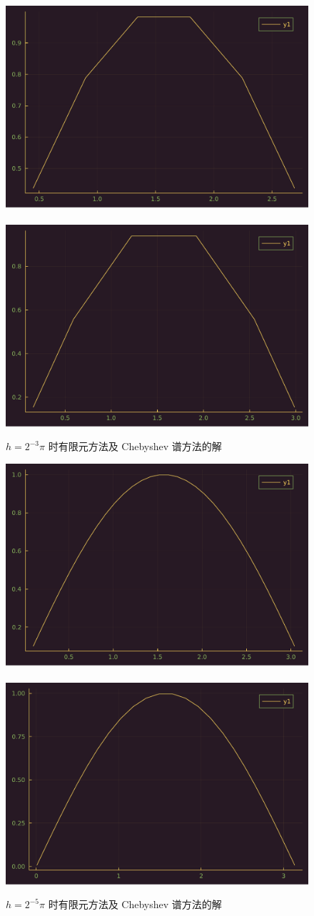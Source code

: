 \documentclass[UTF8, a4paper, 12pt, oneside, onecolumn]{article}
\begin{document}

\begin{figure}[H]\centering
	\includegraphics[width=.48\linewidth]{1dFEM3.pdf}~\includegraphics[width=.48\linewidth]{1dSM3.pdf}
	\caption{$h = 2^{-3}\pi$ 时有限元方法及 Chebyshev 谱方法的解}\label{fig:1dFEMSM3}
\end{figure}

\begin{figure}[H]\centering
	\includegraphics[width=.48\linewidth]{1dFEM.pdf}~\includegraphics[width=.48\linewidth]{1dSM.pdf}
	\caption{$h = 2^{-5}\pi$ 时有限元方法及 Chebyshev 谱方法的解}\label{fig:1dFEMSM}
\end{figure}
\end{document}
